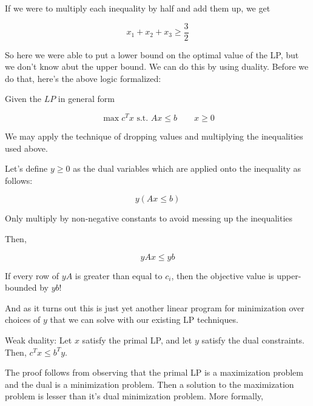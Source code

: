 \documentclass[../notes.tex]{subfiles}
\begin{document}
If we were to multiply each inequality by half and add them up, we get

\begin{equation}
    x_1 + x_2 + x_3 \ge  \frac{3}{2}
\end{equation}

So here we were able to put a lower bound on the optimal value of the LP, but we don't know abut the upper bound. We can do this by using duality.
Before we do that, here's the above logic formalized:

Given the $ LP $ in general form

\begin{equation}
    \max c^T x \text{ s.t. } Ax \le  b \qquad x \ge 0
\end{equation}

We may apply the technique of dropping values and multiplying the inequalities used above.

Let's define $ y \ge 0 $ as the dual variables which are applied onto the inequality as follows:

\begin{equation}
    y(Ax \le  b)
\end{equation}

\begin{blockquote}
    Only multiply by non-negative constants to avoid messing up the inequalities
\end{blockquote}

Then,

\begin{equation}
    yAx \le  yb
\end{equation}

If every row of $ yA $ is greater than equal to $ c_i $, then the objective value is upper-bounded by $ yb $!

And as it turns out this is just yet another linear program for minimization over choices of $ y $ that we can solve with our existing LP techniques.


\begin{theorem}
    Weak duality: Let $ x $ satisfy the primal LP, and let $ y $ satisfy the dual constraints. Then, $ c^Tx \le  b^Ty $.
\end{theorem}

The proof follows from observing that the primal LP is a maximization problem and the dual is a minimization problem. Then a solution to the maximization problem is lesser than it's dual minimization problem. More formally,
\end{document}
